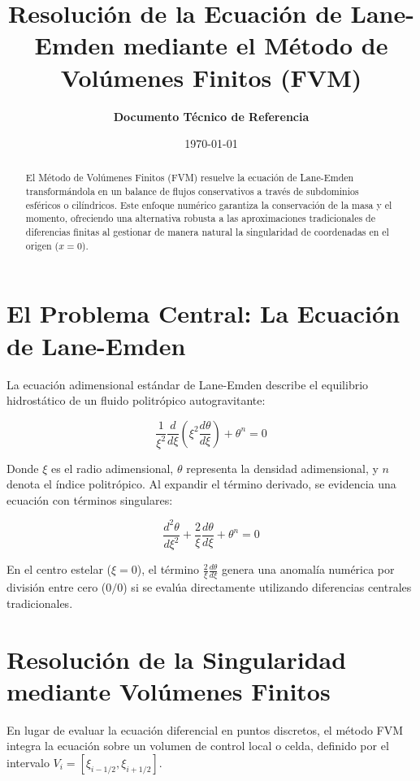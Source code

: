 \documentclass[11pt, lettersize]{article}
\title{\textbf{Resolución de la Ecuación de Lane-Emden mediante el Método de Volúmenes Finitos (FVM)}}
\author{\textbf{Documento Técnico de Referencia}}
\date{\today}
\begin{document}
	
	\maketitle
	
	\begin{abstract}
		El Método de Volúmenes Finitos (FVM) resuelve la ecuación de Lane-Emden transformándola en un balance de flujos conservativos a través de subdominios esféricos o cilíndricos. Este enfoque numérico garantiza la conservación de la masa y el momento, ofreciendo una alternativa robusta a las aproximaciones tradicionales de diferencias finitas al gestionar de manera natural la singularidad de coordenadas en el origen ($x=0$).
	\end{abstract}
	
	\section{El Problema Central: La Ecuación de Lane-Emden}
	La ecuación adimensional estándar de Lane-Emden describe el equilibrio hidrostático de un fluido politrópico autogravitante:
	
	\begin{equation}
		\frac{1}{\xi^2} \frac{d}{d\xi} \left( \xi^2 \frac{d\theta}{d\xi} \right) + \theta^n = 0
	\end{equation}
	
	Donde $\xi$ es el radio adimensional, $\theta$ representa la densidad adimensional, y $n$ denota el índice politrópico. Al expandir el término derivado, se evidencia una ecuación con términos singulares:
	
	\begin{equation}
		\frac{d^2\theta}{d\xi^2} + \frac{2}{\xi}\frac{d\theta}{d\xi} + \theta^n = 0
	\end{equation}
	
	En el centro estelar ($\xi = 0$), el término $\frac{2}{\xi}\frac{d\theta}{d\xi}$ genera una anomalía numérica por división entre cero ($0/0$) si se evalúa directamente utilizando diferencias centrales tradicionales.
	
	\section{Resolución de la Singularidad mediante Volúmenes Finitos}
	En lugar de evaluar la ecuación diferencial en puntos discretos, el método FVM integra la ecuación sobre un volumen de control local o celda, definido por el intervalo $V_i = [\xi_{i-1/2}, \xi_{i+1/2}]$.
	
\end{document}
